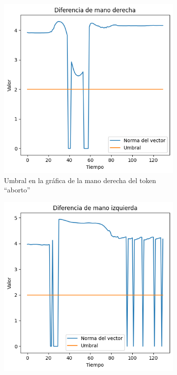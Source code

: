 \begin{figure}[t]
\centering
		\begin{subfigure}[t]{0.3\textwidth}
		\centering
		\includegraphics[align=t,width=0.9\linewidth, height =0.9\linewidth]{Graphics/umbral_missing_rhand_aborto}
		\caption{Umbral en la gráfica de la mano derecha del token ``aborto''}
		\label{f:umbral_rhand_aborto}
	\end{subfigure}
	\begin{subfigure}[t]{0.3\textwidth}
		\centering
		\includegraphics[align=t,width=0.9\linewidth, height =0.9\linewidth]{Graphics/umbral_missing_lhand_aborto}

\end{subfigure}
\end{figure}
